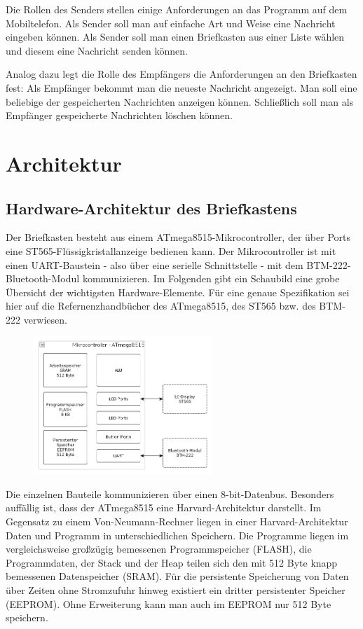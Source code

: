\documentclass[ngerman]{article}
\begin{document}
Die Rollen des Senders stellen einige Anforderungen an das Programm auf dem Mobiltelefon.
Als Sender soll man auf einfache Art und Weise eine Nachricht eingeben können. Als Sender soll
man einen Briefkasten aus einer Liste wählen und diesem eine Nachricht senden können.

Analog dazu legt die Rolle des Empfängers die Anforderungen an den Briefkasten fest:
Als Empfänger bekommt man die neueste Nachricht an\-gezeigt.
Man soll eine beliebige der gespeicherten Nachrichten anzeigen können. Schließlich soll man als
Empfänger gespeicherte Nachrichten löschen können.


\section{Architektur}

        \subsection{Hardware-Architektur des Briefkastens}

Der Briefkasten besteht aus einem ATmega8515-Mikrocontroller, der über Ports eine
ST565-Flüssigkristallanzeige bedienen kann. Der Mikrocontroller ist mit einen
UART-Baustein - also über eine serielle Schnittstelle - mit dem BTM-222-Bluetooth-Modul
kommunizieren. Im Folgenden gibt ein Schaubild eine grobe Übersicht der wichtigsten 
Hardware-Elemente. Für eine genaue Spezifikation sei hier auf die Refernenzhandbücher des ATmega8515, 
des ST565 bzw. des BTM-222 verwiesen. 

\begin{figure}[h!] \begin{center}
    \includegraphics[width=0.6\textwidth]{media/letterbox-atmega-arch}
\end{center} \end{figure}

Die einzelnen Bauteile kommunizieren über einen 8-bit-Datenbus. Besonders auffällig ist,
dass der ATmega8515 eine Harvard-Architektur darstellt. Im Gegensatz zu einem
Von-Neumann-Rechner liegen in einer Harvard-Architektur Daten und Programm in
unterschiedlichen Speichern. Die Programme liegen im vergleichsweise großzügig bemessenen
Programmspeicher (FLASH), die Programmdaten, der Stack und der Heap teilen sich den
mit 512 Byte knapp bemessenen Datenspeicher (SRAM). Für die persistente Speicherung
von Daten über Zeiten ohne Stromzufuhr hinweg existiert ein dritter persistenter Speicher (EEPROM).
Ohne Erweiterung kann man auch im EEPROM nur 512 Byte speichern.
\end{document}
